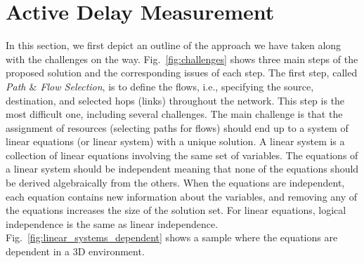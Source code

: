\documentclass[10pt, journal, letterpaper]{IEEEtran}
\begin{document}
\section{Active Delay Measurement}
In this section, we first depict an outline of the approach we have taken along with the challenges on the way. Fig.~\ref{fig:challenges} shows three main steps of the proposed solution and the corresponding issues of each step. 
The first step, called \textit{Path $\&$ Flow Selection}, is to define the flows, i.e., specifying the source, destination, and selected hops (links) throughout the network. This step is the most difficult one, including several challenges. The main challenge is that the assignment of resources (selecting paths for flows) should end up to a system of linear equations (or linear system) with a unique solution. A linear system is a collection of linear equations involving the same set of variables. The equations of a linear system should be independent meaning that none of the equations should be derived algebraically from the others. When the equations are independent, each equation contains new information about the variables, and removing any of the equations increases the size of the solution set. For linear equations, logical independence is the same as linear independence. Fig.~\ref{fig:linear_systems_dependent} shows a sample where the equations are dependent in a 3D environment.
\end{document}
